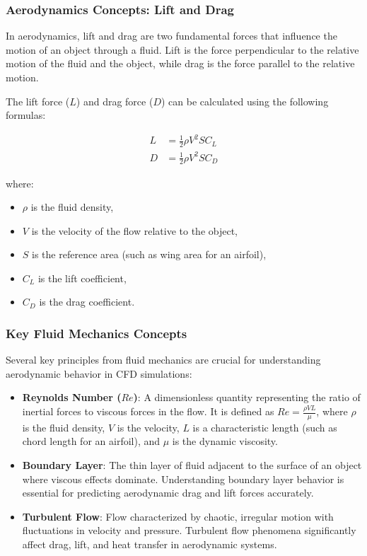 \subsubsection{Aerodynamics Concepts: Lift and Drag}

In aerodynamics, lift and drag are two fundamental forces that influence the motion of an object through a fluid. Lift is the force perpendicular to the relative motion of the fluid and the object, while drag is the force parallel to the relative motion.

The lift force (\(L\)) and drag force (\(D\)) can be calculated using the following formulas:

\begin{align*}
L &= \frac{1}{2} \rho V^2 S C_L \\
D &= \frac{1}{2} \rho V^2 S C_D
\end{align*}

where:
\begin{itemize}
    \item \(\rho\) is the fluid density,
    \item \(V\) is the velocity of the flow relative to the object,
    \item \(S\) is the reference area (such as wing area for an airfoil),
    \item \(C_L\) is the lift coefficient,
    \item \(C_D\) is the drag coefficient.
\end{itemize}

\subsubsection{Key Fluid Mechanics Concepts}

Several key principles from fluid mechanics are crucial for understanding aerodynamic behavior in CFD simulations:

\begin{itemize}
    \item \textbf{Reynolds Number (\(Re\))}: A dimensionless quantity representing the ratio of inertial forces to viscous forces in the flow. It is defined as \(Re = \frac{\rho V L}{\mu}\), where \(\rho\) is the fluid density, \(V\) is the velocity, \(L\) is a characteristic length (such as chord length for an airfoil), and \(\mu\) is the dynamic viscosity.
    
    \item \textbf{Boundary Layer}: The thin layer of fluid adjacent to the surface of an object where viscous effects dominate. Understanding boundary layer behavior is essential for predicting aerodynamic drag and lift forces accurately.
    
    \item \textbf{Turbulent Flow}: Flow characterized by chaotic, irregular motion with fluctuations in velocity and pressure. Turbulent flow phenomena significantly affect drag, lift, and heat transfer in aerodynamic systems.
\end{itemize}
